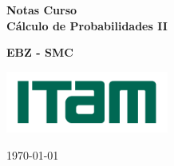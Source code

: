 
\begin{titlepage}
    \begin{center}
    	
    	\vspace*{1cm} 
   
        

    \colorbox{antiflashwhite}{
	  \parbox[t]{1.0\linewidth}{
		\centering \fontsize{30pt}{40pt}\selectfont %
		
		
		\vspace{1cm}
		{ \bfseries Notas Curso } \\
		\vspace{1cm}
		{ \bfseries Cálculo de Probabilidades II} \\
    \vspace*{1cm} 	
		
	}
}        
        
     \vspace{5cm}
     {\bfseries EBZ - SMC} \\
		  \vspace{1cm}
	
	
	   {\centering \large 
      \medskip
      \includegraphics[width = 0.4\textwidth]{logos/itam.png} \\
      }
    
     
     
     \vspace{1cm}
     
     {\centering \LARGE 
     \today \\
     }

    \vfill
        
    \end{center}
\end{titlepage}


\vspace{1cm}